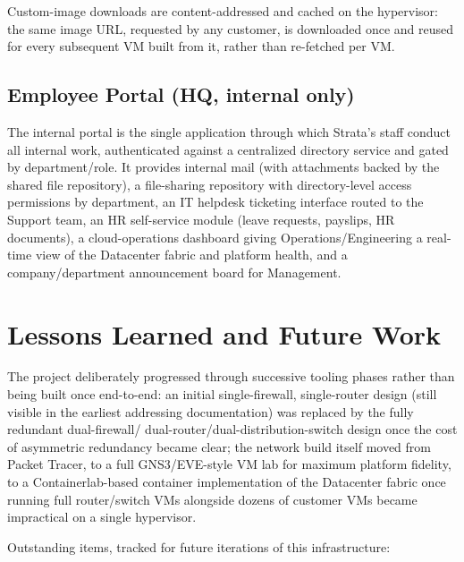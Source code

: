 \documentclass[11pt,a4paper]{report}
\begin{document}
Custom-image downloads are content-addressed and cached on the hypervisor:
the same image URL, requested by any customer, is downloaded once and
reused for every subsequent VM built from it, rather than re-fetched per
VM.

\section{Employee Portal (HQ, internal only)}

The internal portal is the single application through which Strata's staff
conduct all internal work, authenticated against a centralized directory
service and gated by department/role. It provides internal mail (with
attachments backed by the shared file repository), a file-sharing
repository with directory-level access permissions by department, an IT
helpdesk ticketing interface routed to the Support team, an HR
self-service module (leave requests, payslips, HR documents), a
cloud-operations dashboard giving Operations/Engineering a real-time view
of the Datacenter fabric and platform health, and a company/department
announcement board for Management.

\chapter{Lessons Learned and Future Work}

The project deliberately progressed through successive tooling phases
rather than being built once end-to-end: an initial single-firewall,
single-router design (still visible in the earliest addressing
documentation) was replaced by the fully redundant dual-firewall/
dual-router/dual-distribution-switch design once the cost of asymmetric
redundancy became clear; the network build itself moved from Packet
Tracer, to a full GNS3/EVE-style VM lab for maximum platform fidelity, to a
Containerlab-based container implementation of the Datacenter fabric once
running full router/switch VMs alongside dozens of customer VMs became
impractical on a single hypervisor.

Outstanding items, tracked for future iterations of this infrastructure:
\end{document}
